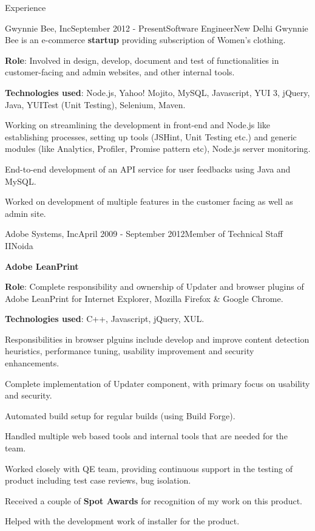 \documentclass{resume} %
\begin{document}
\begin{rSection}{Experience}

\begin{rSubsection}{Gwynnie Bee, Inc}{September 2012 - Present}{Software Engineer}{New Delhi}
Gwynnie Bee is an e-commerce {\bf startup} providing subscription of Women’s clothing.
\item {\bf Role}: Involved in design, develop, document and test of functionalities in customer-facing and
admin websites, and other internal tools.
\item {\bf Technologies used}: Node.js, Yahoo! Mojito, MySQL, Javascript, YUI 3, jQuery, Java, YUITest (Unit Testing), Selenium, Maven.
\item Working on streamlining the development in front-end and Node.js like establishing processes, setting up tools (JSHint, Unit Testing etc.) and generic modules (like Analytics, Profiler, Promise pattern etc), Node.js server monitoring.
\item End-to-end development of an API service for user feedbacks using Java and MySQL.
\item Worked on development of multiple features in the customer facing as well as admin site.
\end{rSubsection}


\begin{rSubsection}{Adobe Systems, Inc}{April 2009 - September 2012}{Member of Technical Staff II}{Noida}
\item {\bf Adobe LeanPrint}
\item {\bf Role}: Complete responsibility and ownership of Updater and browser plugins of Adobe LeanPrint for Internet Explorer, Mozilla Firefox \& Google Chrome.
\item {\bf Technologies used}: C++, Javascript, jQuery, XUL.
\item Responsibilities in browser plguins include develop and improve content detection heuristics, performance tuning, usability improvement and security enhancements.
\item Complete implementation of Updater component, with primary focus on usability and security.
\item Automated build setup for regular builds (using Build Forge).
\item Handled multiple web based tools and internal tools that are needed for the team.
\item Worked closely with QE team, providing continuous support in the testing of product
including test case reviews, bug isolation.
\item Received a couple of {\bf Spot Awards} for recognition of my work on this product.
\item Helped with the development work of installer for the product.


\end{rSubsection}
\end{rSection}
\end{document}
